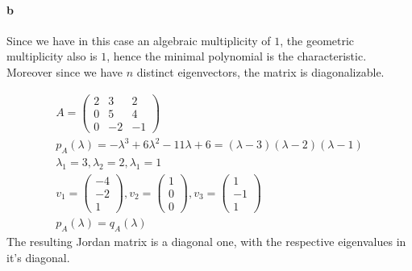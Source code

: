 \paragraph{b}
Since we have in this case an algebraic multiplicity of $1$, the geometric multiplicity also is $1$, hence the minimal polynomial is the characteristic. Moreover since we have $n$ distinct eigenvectors, the matrix is diagonalizable.

\begin{gather*}
A = \left( \begin{array}{ccc}
2&3&2\\
0&5&4\\
0&-2&-1
\end{array} \right)\\
p_A(\lambda) = -\lambda ^3  + 6 \lambda^2 - 11 \lambda + 6 = (\lambda-3)(\lambda-2)(\lambda-1)\\
\lambda_1 =  3,\lambda_2 =2 , \lambda_1 =1 \\
v_1 = \left( \begin{array}{c}
-4\\
-2\\
1 
\end{array}\right),
v_2 = \left( \begin{array}{c}
1\\
0\\
0
\end{array} \right),
v_3 = \left( \begin{array}{c}
1\\
-1\\
1
\end{array} \right)\\
p_A(\lambda) = q_A(\lambda) 
\end{gather*}
The resulting Jordan matrix is a diagonal one, with the respective eigenvalues in it's diagonal.

